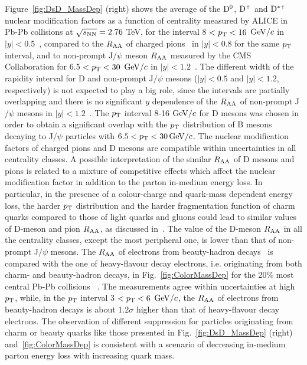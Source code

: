 Figure~\ref{fig:DsD_MassDep} (right) shows the average of the ${\rm D^0}$, ${\rm D^+}$ and ${\rm D^{*+}}$ 
nuclear modification factors as a function of centrality measured by ALICE in
Pb-Pb collisions at $\sqrt{s_{\rm NN}} =  2.76$ TeV, for the interval 8 $< p_{\rm T} < 16$ $\mathrm{GeV}/c$  in $|y| < 0.5$~\cite{Adam:2015nna}, 
compared to the $R_{\rm AA}$ of charged pions~\cite{Abelev:2014laa} in $|y| < 0.8$ for the same $p_{\rm T}$ interval, 
and to non-prompt J$/\psi$ meson $R_{\rm AA}$ measured by the CMS Collaboration for 6.5 $< p_{\rm T} < 30$ $\mathrm{GeV}/c$ 
in $|y| < 1.2$~\cite{Khachatryan:2016ypw}. The different width of the rapidity interval for D and non-prompt
J$/\psi$ mesons ($|y| < 0.5$ and $|y| < 1.2$, respectively) is not expected to play a big role, since
the intervals are partially overlapping and there is no significant $y$ dependence of the $R_{\rm AA}$ of 
non-prompt J$/\psi$ mesons in $|y| < 1.2$~\cite{Khachatryan:2016ypw}. 
The $p_{\rm T}$ interval 8-16 $\mathrm{GeV}/c$ for D mesons was chosen 
in order to obtain a significant overlap with the $p_{\rm T}$ distribution 
of B mesons decaying to J/$\psi$ particles with $6.5 < p_{\rm T} < 30\, \mathrm{GeV}/c$.
The nuclear modification 
factors of charged pions and D mesons are compatible within uncertainties
in all centrality classes. A possible interpretation of the similar $R_{\rm AA}$ of D mesons and pions is 
related to a mixture of competitive effects which affect the nuclear modification
factor in addition to the parton in-medium energy loss. In particular,
in the presence of a colour-charge and quark-mass dependent 
energy loss, the harder $p_{\rm T}$ distribution and the harder fragmentation function of 
charm quarks compared to those of light quarks and gluons could lead to similar 
values of D-meson and pion $R_{\rm AA}$, as discussed in~\cite{Djordjevic:2013pba}. 
The value of the D-meson $R_{\rm AA}$ in all the centrality
classes, except the most peripheral one, is lower than that of non-prompt J$/\psi$ mesons. 
The $R_{\rm AA}$ of electrons from beauty-hadron decays~\cite{Adam:2016wyz} 
is compared with the one of heavy-flavour decay electrons, i.e. originating from both charm- and
beauty-hadron decays, in Fig.~\ref{fig:ColorMassDep} 
for the 20\% most central Pb-Pb collisions
~\cite{Adam:2016khe}. The measurements agree within 
uncertainties at high $p_{\rm T}$, while, in the $p_{\rm T}$ 
interval 3 $< p_{\rm T} < 6$ $\mathrm{GeV}/c$, the $R_{\rm AA}$ 
of electrons from beauty-hadron decays 
is about 1.2$\sigma$ higher than that of heavy-flavour decay 
electrons. The observation of different 
suppression for particles originating from
charm or beauty quarks like those presented in Fig.~\ref{fig:DsD_MassDep} (right) and~\ref{fig:ColorMassDep} 
is consistent with a scenario of decreasing in-medium 
parton energy loss with increasing quark mass.\\

